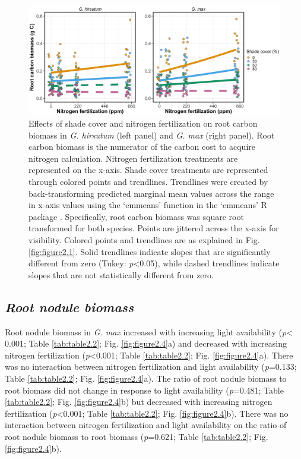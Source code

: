 \newpage
\begin{landscape}
\begin{figure}
    \centering
    \includegraphics[width = \columnwidth]{ch2_LxN_Greenhouse/figs/fig3_rootCarbon.jpg}
    \caption[Effects of shade cover and nitrogen fertilization on root carbon biomass in \textit{G. hirsutum} and \textit{G. max}]{Effects of shade cover and nitrogen fertilization on root carbon biomass in \textit{G. hirsutum} (left panel) and \textit{G. max} (right panel). Root carbon biomass is the numerator of the carbon cost to acquire nitrogen calculation. Nitrogen fertilization treatments are represented on the x-axis. Shade cover treatments are represented through colored points and trendlines. Trendlines were created by back-transforming predicted marginal mean values across the range in x-axis values using the `emmeans’ function in the `emmeans’ R package . Specifically, root carbon biomass was square root transformed for both species. Points are jittered across the x-axis for visibility. Colored points and trendlines are as explained in Fig. \ref{fig:figure2.1}. Solid trendlines indicate slopes that are significantly different from zero (Tukey: \textit{p}<0.05), while dashed trendlines indicate slopes that are not statistically different from zero.}
    \label{fig:figure2.3}
\end{figure}
\end{landscape}
\clearpage

\newpage
\subsection{\textit{Root nodule biomass}}
\noindent Root nodule biomass in \textit{G. max} increased with increasing light availability (\textit{p}< 0.001; Table \ref{tab:table2.2}; Fig. \ref{fig:figure2.4}a) and decreased with increasing nitrogen fertilization (\textit{p}<0.001; Table \ref{tab:table2.2}; Fig. \ref{fig:figure2.4}a). There was no interaction between nitrogen fertilization and light availability (\textit{p}=0.133; Table \ref{tab:table2.2}; Fig. \ref{fig:figure2.4}a). The ratio of root nodule biomass to root biomass did not change in response to light availability (\textit{p}=0.481; Table \ref{tab:table2.2}; Fig. \ref{fig:figure2.4}b) but decreased with increasing nitrogen fertilization (\textit{p}<0.001; Table \ref{tab:table2.2}; Fig. \ref{fig:figure2.4}b). There was no interaction between nitrogen fertilization and light availability on the ratio of root nodule biomass to root biomass (\textit{p}=0.621; Table \ref{tab:table2.2}; Fig. \ref{fig:figure2.4}b).


